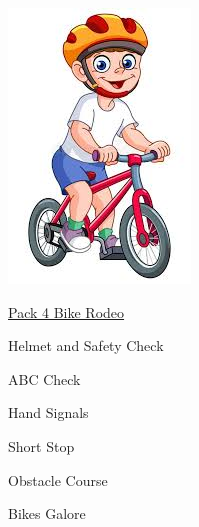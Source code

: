 \documentclass[12pt]{article}
\begin{document}
\vspace{0.5in}


\begin{minipage}{.5\textwidth}
\noindent\includegraphics[width = \textwidth]{bike.jpg}
\end{minipage}\begin{minipage}{.5\textwidth}
\huge \underline{Pack 4 Bike Rodeo}
\begin{todolist}
\item Helmet and Safety Check
\item ABC Check
\item Hand Signals
\item Short Stop
\item Obstacle Course
\item Bikes Galore
\end{todolist}
\end{minipage}
\end{document}
